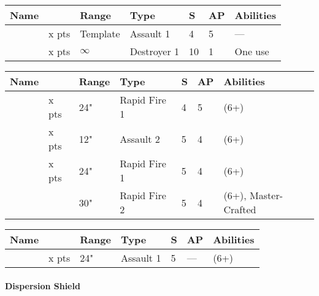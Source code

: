  \label{Ranged Weapons}


\label{Gauntlet of Fire} \label{Tachyon Arrow}
\noindent
\begin{tabular}{||m{110pt} m{30pt} m{31pt} m{55pt} m{12pt} m{12pt} m{210pt}||}
	\hline
	Name & & Range & Type & S & AP & Abilities \\
	\hline
	\quickref{Gauntlet of Fire} & x pts& Template & Assault 1 & 4 & 5 & — \\
	\quickref{Tachyon Arrow} & x pts& $\infty$ & Destroyer 1 & 10 & 1 & One use \\
	\hline
\end{tabular}




\label{Gauss Blaster} \label{Gauss Flayer} \label{Gauss Reaper} \label{Relic Gauss Blaster}
\noindent
\begin{tabular}{||m{110pt} m{30pt} m{31pt} m{55pt} m{12pt} m{12pt} m{210pt}||}
	\hline
	Name & & Range & Type & S & AP & Abilities \\
	\hline
	\quickref{Gauss Flayer} & x pts& 24" & Rapid Fire 1 & 4 & 5 & \quickref{Gauss} (6+) \\
	\quickref{Gauss Reaper} & x pts& 12" & Assault 2 & 5 & 4 & \quickref{Gauss} (6+) \\
	\quickref{Gauss Blaster} & x pts& 24" & Rapid Fire 1 & 5 & 4 & \quickref{Gauss} (6+) \\
	\quickref{Relic Gauss Blaster} & & 30" & Rapid Fire 2 & 5 & 4 & \quickref{Gauss} (6+), Master-Crafted \\	
	\hline
\end{tabular}


\label{Tesla Carbine}
\noindent
\begin{tabular}{||m{110pt} m{30pt} m{31pt} m{55pt} m{12pt} m{12pt} m{210pt}||}
	\hline
	Name & & Range & Type & S & AP & Abilities \\
	\hline
	\quickref{Tesla Carbine} & x pts& 24" & Assault 1 & 5 & — & \quickref{Tesla} (6+) \\	
	\hline
\end{tabular}


 \label{Technoarcana}

\paragraph*{Dispersion Shield} \label{Dispersion Shield}

